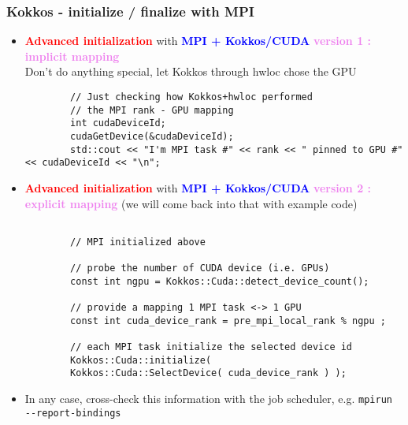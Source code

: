 \begin{frame}[fragile=singleslide]
  \frametitle{Kokkos - initialize / finalize with MPI}

  \begin{itemize}
  \item \textcolor{red}{\textbf{Advanced initialization}} with \textcolor{blue}{\textbf{MPI + Kokkos/CUDA}} \textcolor{violet}{\textbf{version 1 : implicit mapping}}\\
    Don't do anything special, let Kokkos through hwloc chose the GPU
    {\scriptsize
      \begin{verbatim}
        // Just checking how Kokkos+hwloc performed
        // the MPI rank - GPU mapping 
        int cudaDeviceId;
        cudaGetDevice(&cudaDeviceId);
        std::cout << "I'm MPI task #" << rank << " pinned to GPU #" << cudaDeviceId << "\n";
      \end{verbatim} 
    }
  \item \textcolor{red}{\textbf{Advanced initialization}} with \textcolor{blue}{\textbf{MPI + Kokkos/CUDA}} \textcolor{violet}{\textbf{version 2 : explicit mapping}}
    (we will come back into that with example code)
    {\scriptsize
      \begin{verbatim}
        
        // MPI initialized above
        
        // probe the number of CUDA device (i.e. GPUs)
        const int ngpu = Kokkos::Cuda::detect_device_count();
        
        // provide a mapping 1 MPI task <-> 1 GPU
        const int cuda_device_rank = pre_mpi_local_rank % ngpu ;
        
        // each MPI task initialize the selected device id
        Kokkos::Cuda::initialize(
        Kokkos::Cuda::SelectDevice( cuda_device_rank ) );
      \end{verbatim}
    }
  \item In any case, cross-check this information with the job scheduler, e.g. \texttt{mpirun \--\--report-bindings}
  \end{itemize}
\end{frame}

